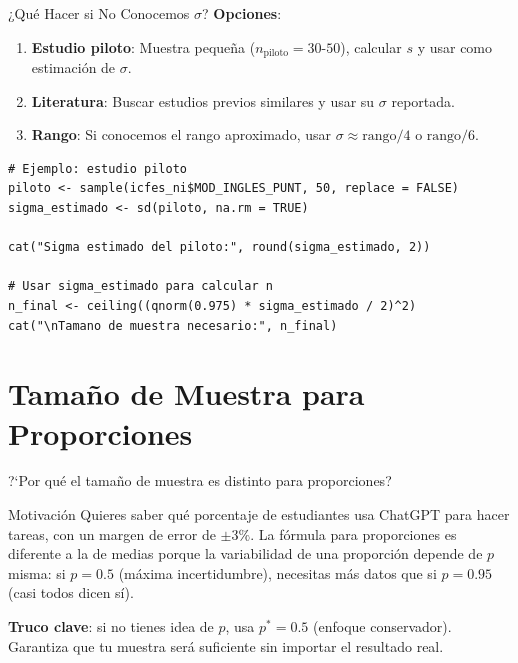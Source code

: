 \documentclass[aspectratio=169, 11pt]{beamer}
\begin{document}
\begin{frame}[fragile]{¿Qué Hacer si No Conocemos $\sigma$?}
\textbf{Opciones}:
\begin{enumerate}
  \item \textbf{Estudio piloto}: Muestra pequeña ($n_{\text{piloto}} = 30\text{-}50$), calcular $s$ y usar como estimación de $\sigma$.
  \item \textbf{Literatura}: Buscar estudios previos similares y usar su $\sigma$ reportada.
  \item \textbf{Rango}: Si conocemos el rango aproximado, usar $\sigma \approx \text{rango}/4$ o $\text{rango}/6$.
\end{enumerate}

\begin{lstlisting}[basicstyle=\ttfamily\scriptsize]
# Ejemplo: estudio piloto
piloto <- sample(icfes_ni$MOD_INGLES_PUNT, 50, replace = FALSE)
sigma_estimado <- sd(piloto, na.rm = TRUE)

cat("Sigma estimado del piloto:", round(sigma_estimado, 2))

# Usar sigma_estimado para calcular n
n_final <- ceiling((qnorm(0.975) * sigma_estimado / 2)^2)
cat("\nTamano de muestra necesario:", n_final)
\end{lstlisting}
\end{frame}

\section{Tamaño de Muestra para Proporciones}

\begin{frame}{?`Por qu\'e el tama\~no de muestra es distinto para proporciones?}
\begin{exampleblock}{Motivaci\'on}
Quieres saber qu\'e porcentaje de estudiantes usa ChatGPT para hacer tareas, con un margen de error de $\pm 3\%$. La f\'ormula para proporciones es diferente a la de medias porque la variabilidad de una proporci\'on depende de $p$ misma: si $p = 0.5$ (m\'axima incertidumbre), necesitas m\'as datos que si $p = 0.95$ (casi todos dicen s\'i).
\end{exampleblock}

\textbf{Truco clave}: si no tienes idea de $p$, usa $p^* = 0.5$ (enfoque conservador). Garantiza que tu muestra ser\'a suficiente sin importar el resultado real.
\end{frame}
\end{document}
